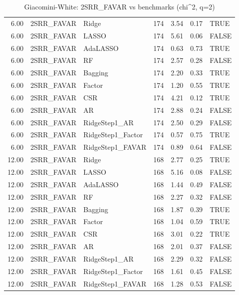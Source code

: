 \begin{table}[ht]
\begin{tabular}{rllrrrl}
  6.00 & 2SRR\_FAVAR & Ridge & 174 & 3.54 & 0.17 & TRUE \\ 
  6.00 & 2SRR\_FAVAR & LASSO & 174 & 5.61 & 0.06 & FALSE \\ 
  6.00 & 2SRR\_FAVAR & AdaLASSO & 174 & 0.63 & 0.73 & TRUE \\ 
  6.00 & 2SRR\_FAVAR & RF & 174 & 2.57 & 0.28 & FALSE \\ 
  6.00 & 2SRR\_FAVAR & Bagging & 174 & 2.20 & 0.33 & TRUE \\ 
  6.00 & 2SRR\_FAVAR & Factor & 174 & 1.20 & 0.55 & TRUE \\ 
  6.00 & 2SRR\_FAVAR & CSR & 174 & 4.21 & 0.12 & TRUE \\ 
  6.00 & 2SRR\_FAVAR & AR & 174 & 2.88 & 0.24 & FALSE \\ 
  6.00 & 2SRR\_FAVAR & RidgeStep1\_AR & 174 & 2.50 & 0.29 & FALSE \\ 
  6.00 & 2SRR\_FAVAR & RidgeStep1\_Factor & 174 & 0.57 & 0.75 & TRUE \\ 
  6.00 & 2SRR\_FAVAR & RidgeStep1\_FAVAR & 174 & 0.89 & 0.64 & FALSE \\ 
  12.00 & 2SRR\_FAVAR & Ridge & 168 & 2.77 & 0.25 & TRUE \\ 
  12.00 & 2SRR\_FAVAR & LASSO & 168 & 5.16 & 0.08 & FALSE \\ 
  12.00 & 2SRR\_FAVAR & AdaLASSO & 168 & 1.44 & 0.49 & FALSE \\ 
  12.00 & 2SRR\_FAVAR & RF & 168 & 2.27 & 0.32 & FALSE \\ 
  12.00 & 2SRR\_FAVAR & Bagging & 168 & 1.87 & 0.39 & TRUE \\ 
  12.00 & 2SRR\_FAVAR & Factor & 168 & 1.04 & 0.59 & TRUE \\ 
  12.00 & 2SRR\_FAVAR & CSR & 168 & 3.01 & 0.22 & TRUE \\ 
  12.00 & 2SRR\_FAVAR & AR & 168 & 2.01 & 0.37 & FALSE \\ 
  12.00 & 2SRR\_FAVAR & RidgeStep1\_AR & 168 & 2.29 & 0.32 & FALSE \\ 
  12.00 & 2SRR\_FAVAR & RidgeStep1\_Factor & 168 & 1.61 & 0.45 & FALSE \\ 
  12.00 & 2SRR\_FAVAR & RidgeStep1\_FAVAR & 168 & 1.28 & 0.53 & FALSE \\ 
   \hline
\end{tabular}
\caption{Giacomini-White: 2SRR_FAVAR vs benchmarks (chi^2, q=2)} 
\label{tab:gw}
\end{table}
